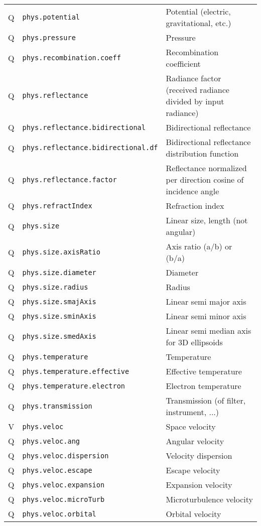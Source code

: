 \documentclass[11pt,a4paper]{ivoa}
\begin{document}
\begin{longtable}[h!]{c|p{40ex}|p{}}
Q & {\tt phys.potential} & Potential (electric, gravitational, etc.)\\
Q & {\tt phys.pressure} & Pressure\\
Q & {\tt phys.recombination.coeff} & Recombination coefficient\\
Q & {\tt phys.reflectance} & Radiance factor (received radiance divided by input radiance)\\
Q & {\tt phys.reflectance.bidirectional} & Bidirectional reflectance\\
Q & {\tt phys.reflectance.bidirectional.df} & Bidirectional reflectance distribution function\\
Q & {\tt phys.reflectance.factor} & Reflectance normalized per direction cosine of incidence angle\\
Q & {\tt phys.refractIndex} & Refraction index\\
Q & {\tt phys.size} & Linear size, length (not angular)\\
Q & {\tt phys.size.axisRatio} & Axis ratio (a/b) or (b/a)\\
Q & {\tt phys.size.diameter} & Diameter\\
Q & {\tt phys.size.radius} & Radius\\
Q & {\tt phys.size.smajAxis} & Linear semi major axis\\
Q & {\tt phys.size.sminAxis} & Linear semi minor axis\\
Q & {\tt phys.size.smedAxis} & Linear semi median axis for 3D ellipsoids\\
Q & {\tt phys.temperature} & Temperature\\
Q & {\tt phys.temperature.effective} & Effective temperature\\
Q & {\tt phys.temperature.electron} & Electron temperature\\
Q & {\tt phys.transmission} & Transmission (of filter, instrument, ...)\\
V & {\tt phys.veloc} & Space velocity\\
Q & {\tt phys.veloc.ang} & Angular velocity\\
Q & {\tt phys.veloc.dispersion} & Velocity dispersion\\
Q & {\tt phys.veloc.escape} & Escape velocity\\
Q & {\tt phys.veloc.expansion} & Expansion velocity\\
Q & {\tt phys.veloc.microTurb} & Microturbulence velocity\\
Q & {\tt phys.veloc.orbital} & Orbital velocity\\

\end{longtable}
\end{document}
